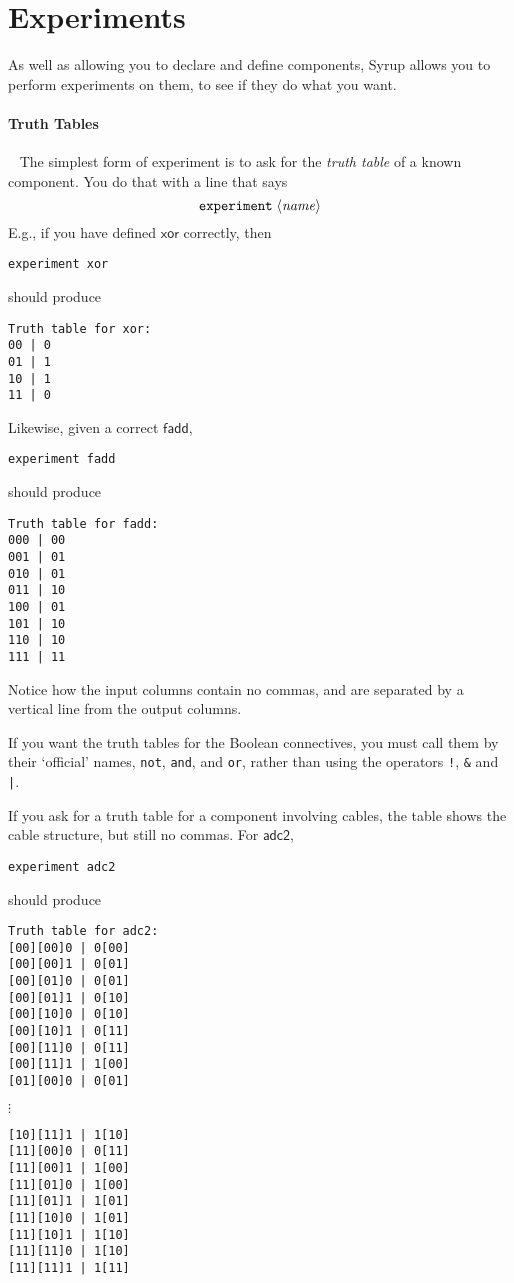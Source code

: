 \documentclass{article}
\newcommand{\C}{\mathsf}
\begin{document}
\section{Experiments}

As well as allowing you to declare and define components, Syrup allows
you to perform experiments on them, to see if they do what you want.

\paragraph{Truth Tables}~
The simplest form of experiment is to ask for the \emph{truth table}
of a known component. You do that with a line that says
\[
\texttt{experiment}\; \langle\mathit{name}\rangle
\]
E.g., if you have defined $\C{xor}$ correctly, then
\begin{verbatim}
experiment xor
\end{verbatim}
should produce
\begin{verbatim}
Truth table for xor:
00 | 0
01 | 1
10 | 1
11 | 0
\end{verbatim}

Likewise, given a correct $\C{fadd}$,
\begin{verbatim}
experiment fadd
\end{verbatim}
should produce
\begin{verbatim}
Truth table for fadd:
000 | 00
001 | 01
010 | 01
011 | 10
100 | 01
101 | 10
110 | 10
111 | 11
\end{verbatim}

Notice how the input columns contain no commas, and are separated by a
vertical line from the output columns.

If you want the truth tables for the Boolean connectives, you must
call them by their `official' names, \texttt{not}, \texttt{and}, and
\texttt{or}, rather than using the operators \texttt{!}, \texttt{\&}
and \texttt{|}.

If you ask for a truth table for a component involving cables,
the table shows the cable structure, but still no commas. For
$\C{adc2}$,
\begin{verbatim}
experiment adc2
\end{verbatim}
should produce
\begin{verbatim}
Truth table for adc2:
[00][00]0 | 0[00]
[00][00]1 | 0[01]
[00][01]0 | 0[01]
[00][01]1 | 0[10]
[00][10]0 | 0[10]
[00][10]1 | 0[11]
[00][11]0 | 0[11]
[00][11]1 | 1[00]
[01][00]0 | 0[01]
\end{verbatim}
$\vdots$
\begin{verbatim}
[10][11]1 | 1[10]
[11][00]0 | 0[11]
[11][00]1 | 1[00]
[11][01]0 | 1[00]
[11][01]1 | 1[01]
[11][10]0 | 1[01]
[11][10]1 | 1[10]
[11][11]0 | 1[10]
[11][11]1 | 1[11]
\end{verbatim}
\end{document}
